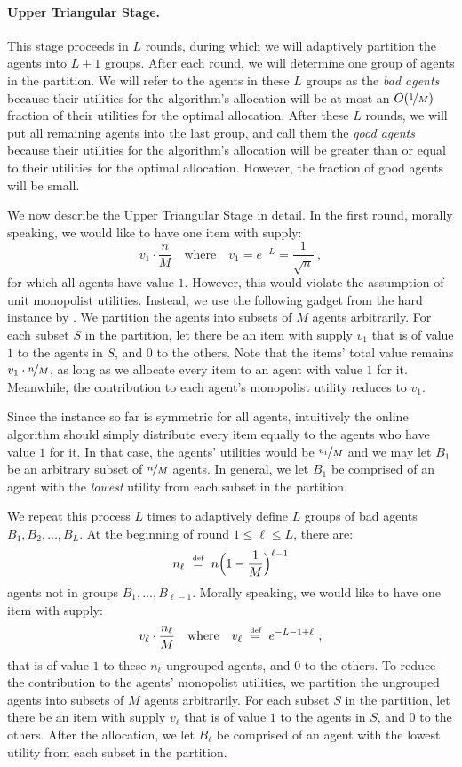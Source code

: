 \documentclass[11pt,letterpaper]{article}
\newcommand{\defeq}{\stackrel{\textrm{\tiny def}}{=}}
\begin{document}
\paragraph{Upper Triangular Stage.}
This stage proceeds in $L$ rounds, during which we will adaptively partition the agents into $L+1$ groups.
After each round, we will determine one group of agents in the partition.
We will refer to the agents in these $L$ groups as the \emph{bad agents} because their utilities for the algorithm's allocation will be at most an $O(\nicefrac{1}{M})$ fraction of their utilities for the optimal allocation.
After these $L$ rounds, we will put all remaining agents into the last group, and call them the \emph{good agents} because their utilities for the algorithm's allocation will be greater than or equal to their utilities for the optimal allocation.
However, the fraction of good agents will be small.

We now describe the Upper Triangular Stage in detail.
In the first round, morally speaking, we would like to have one item with supply:
\[
	v_1 \cdot \frac{n}{M}
	\quad
	\text{where}
	\quad
	v_1 = e^{-L} = \frac{1}{\sqrt{n}}
	~,
\]
for which all agents have value $1$.
However, this would violate the assumption of unit monopolist utilities. Instead, we use the following gadget from the hard instance by \citet{BanerjeeGGJ:SODA:2022}.
We partition the agents into subsets of $M$ agents arbitrarily.
For each subset $S$ in the partition, let there be an item with supply $v_1$ that  is of value $1$ to the agents in $S$, and $0$ to the others.
Note that the items' total value remains $v_1 \cdot \nicefrac{n}{M}$, as long as we allocate every item to an agent with value $1$ for it.
Meanwhile, the contribution to each agent's monopolist utility reduces to $v_1$.

Since the instance so far is symmetric for all agents, intuitively the online algorithm should simply distribute every item equally to the agents who have value $1$ for it.
In that case, the agents' utilities would be $\nicefrac{v_1}{M}$ and we may let $B_1$ be an arbitrary subset of $\nicefrac{n}{M}$ agents.
In general, we let $B_1$ be comprised of an agent with the \emph{lowest} utility from each subset in the partition.

We repeat this process $L$ times to adaptively define $L$ groups of bad agents $B_1, B_2, \dots, B_L$.
At the beginning of round $1 \le \ell \le L$, there are:
\[
	n_\ell ~\defeq~ n \Big(1 - \frac{1}{M} \Big)^{\ell-1}
\]
agents not in groups $B_1, \dots, B_{\ell - 1}$.
Morally speaking, we would like to have one item with supply:
\[
	v_\ell \cdot \frac{n_\ell}{M}
	\quad
	\text{where}
	\quad
	v_\ell ~\defeq~ e^{-L-1+\ell}
	~,
\]
that is of value $1$ to these $n_\ell$ ungrouped agents, and $0$ to the others.
To reduce the contribution to the agents' monopolist utilities, we partition the ungrouped agents into subsets of $M$ agents arbitrarily.
For each subset $S$ in the partition, let there be an item with supply $v_\ell$ that is of value $1$ to the agents in $S$, and $0$ to the others.
After the allocation, we let $B_\ell$ be comprised of an agent with the lowest utility from each subset in the partition.
\end{document}
